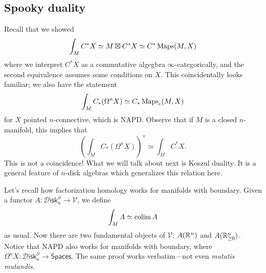 \documentclass{amsart}
\begin{document}
\subsection{Spooky duality}

Recall that we showed
\begin{equation*}
    \int_M C^*X \simeq M\boxtimes C^*X \simeq C^*\operatorname{Maps}(M,X)
\end{equation*}
where we interpret $C^*X$ as a commutative algegbra $\infty$-categorically,
and the second equivalence assumes some conditions on $X$.
This coincidentally looks familiar; we also have the statement
\begin{equation*}
    \int_M C_*(\Omega^nX) \simeq C_*\operatorname{Maps}_c(M,X)
\end{equation*}
for $X$ pointed $n$-connective, which is NAPD.
Observe that if $M$ is a closed $n$-manifold, this implies that
\begin{equation*}
    \left(\int_M C_*(\Omega^nX)\right)^\vee \simeq \int_M C^*X.
\end{equation*}
This is not a coincidence! What we will talk about next is Koszul duality. It is a
general feature of $n$-disk algebras which generalizes this relation here.

Let's recall how factorization homology works for manifolds with boundary.
Given a functor $A:\mathcal{D}\mathsf{isk}_n^\partial\to \mathcal{V}$, we define
\begin{equation*}
    \int_M A \simeq \operatorname*{colim} A
\end{equation*}
as usual.
Now there are two fundamental objects of $\mathcal{V}$: $A(\mathbb{R}^n)$ and $A(\mathbb{R}^n_{\geq 0})$.
Notice that NAPD also works for manifolds with boundary, where
$\Omega^nX:\mathcal{D}\mathsf{isk}_n^\partial \to \mathsf{Spaces}$.
The same proof works verbatim---not even \textit{mutatis mutandis}.
\end{document}
